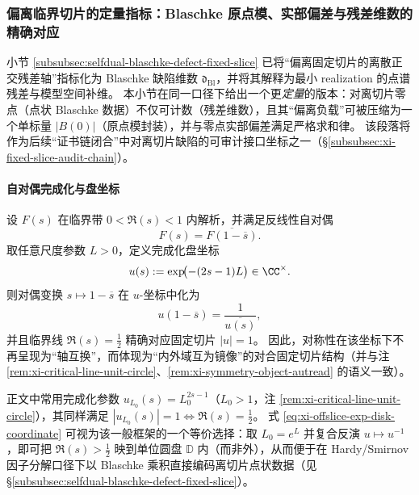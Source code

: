 \subsubsection{偏离临界切片的定量指标：Blaschke 原点模、实部偏差与残差维数的精确对应}\label{subsubsec:xi-offslice-quantitative-indicators}
小节 \ref{subsubsec:selfdual-blaschke-defect-fixed-slice} 已将“偏离固定切片的离散正交残差轴”指标化为 Blaschke 缺陷维数 \(\mathfrak d_{\mathrm{Bl}}\)，并将其解释为最小 realization 的点谱残差与模型空间补维。
本小节在同一口径下给出一个更\emph{定量}的版本：对离切片零点（点状 Blaschke 数据）不仅可计数（残差维数），且其“偏离负载”可被压缩为一个单标量 \(|B(0)|\)（原点模封装），并与零点实部偏差满足严格求和律。
该段落将作为后续“证书链闭合”中对离切片缺陷的可审计接口坐标之一（\S\ref{subsubsec:xi-fixed-slice-audit-chain}）。

\paragraph{自对偶完成化与盘坐标}
设 \(F(s)\) 在临界带 \(0<\Re(s)<1\) 内解析，并满足反线性自对偶
\begin{equation}\label{eq:xi-offslice-selfdual-on-strip}
F(s)=\overline{F(1-\overline s)}.
\end{equation}
取任意尺度参数 \(L>0\)，定义完成化盘坐标
\begin{equation}\label{eq:xi-offslice-exp-disk-coordinate}
u(s):=\exp\!\bigl(-(2s-1)L\bigr)\in\CC^\times.
\end{equation}
则对偶变换 \(s\mapsto 1-\overline s\) 在 \(u\)-坐标中化为
\begin{equation}\label{eq:xi-offslice-exp-disk-duality}
u(1-\overline s)=\frac{1}{\overline{u(s)}},
\end{equation}
并且临界线 \(\Re(s)=\tfrac12\) 精确对应固定切片 \(|u|=1\)。
因此，对称性在该坐标下不再呈现为“轴互换”，而体现为“内外域互为镜像”的对合固定切片结构（并与注 \ref{rem:xi-critical-line-unit-circle}、\ref{rem:xi-symmetry-object-autread} 的语义一致）。

\begin{remark}\label{rem:xi-offslice-exp-vs-dirichlet}
正文中常用完成化参数 \(u_{L_0}(s)=L_0^{2s-1}\)（\(L_0>1\)，注 \ref{rem:xi-critical-line-unit-circle}），其同样满足 \(|u_{L_0}(s)|=1\iff \Re(s)=\tfrac12\)。
式 \eqref{eq:xi-offslice-exp-disk-coordinate} 可视为该一般框架的一个等价选择：取 \(L_0=e^{L}\) 并复合反演 \(u\mapsto u^{-1}\)，即可把 \(\Re(s)>\tfrac12\) 映到单位圆盘 \(\mathbb{D}\) 内（而非外），从而便于在 Hardy/Smirnov 因子分解口径下以 Blaschke 乘积直接编码离切片点状数据（见 \S\ref{subsubsec:selfdual-blaschke-defect-fixed-slice}）。
\end{remark}

